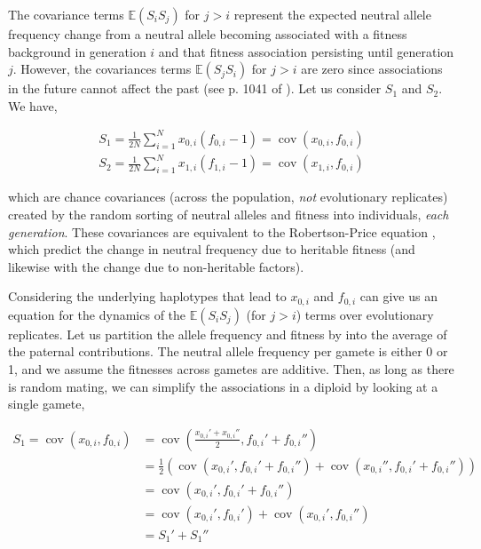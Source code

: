 \documentclass[11pt]{article}
\newcommand{\E}{\mathbb{E}}
\DeclareMathOperator{\cov}{cov}
\begin{document}
The covariance terms $\E(S_i S_j)$ for $j > i$ represent the expected neutral
allele frequency change from a neutral allele becoming associated with a
fitness background in generation $i$ and that fitness association persisting
until generation $j$. However, the covariances terms $\E(S_j S_i)$ for $j > i$
are zero since associations in the future cannot affect the past (see p. 1041
of \cite{Buffalo2019-qs}). Let us consider $S_1$ and $S_2$. We have,

\begin{align}
  S_1 = \frac{1}{2N} \sum_{i=1}^N x_{0,i}(f_{0,i} - 1) = \cov(x_{0,i}, f_{0,i}) \\
  S_2 = \frac{1}{2N} \sum_{i=1}^N x_{1,i}(f_{1,i} - 1) = \cov(x_{1,i}, f_{0,i})
\end{align}

which are chance covariances (across the population, \emph{not} evolutionary
replicates) created by the random sorting of neutral alleles and fitness into
individuals, \emph{each generation}. These covariances are equivalent to the
Robertson-Price equation \parencite{Robertson1966-fs,Price1970-si}, which
predict the change in neutral frequency due to heritable fitness (and likewise
with the change due to non-heritable factors).

Considering the underlying haplotypes that lead to $x_{0,i}$ and $f_{0,i}$ can
give us an equation for the dynamics of the $\E(S_i S_j)$ (for $j > i$) terms
over evolutionary replicates. Let us partition the allele frequency and fitness
by into the average of the paternal contributions. The neutral allele frequency
per gamete is either 0 or 1, and we assume the fitnesses across gametes are
additive. Then, as long as there is random mating, we can simplify the
associations in a diploid by looking at a single gamete,

\begin{align}
  S_1 = \cov(x_{0,i}, f_{0,i}) &= \cov\left(\frac{x_{0,i}' + x_{0,i}''}{2}, f_{0,i}' + f_{0,i}''\right)  \\
                               &= \frac{1}{2}\left(\cov(x_{0,i}', f_{0,i}' + f_{0,i}'') + \cov(x_{0,i}'', f_{0,i}' + f_{0,i}'')\right)  \\
                               &= \cov(x_{0,i}', f_{0,i}' + f_{0,i}'')  \\
                               &= \cov(x_{0,i}', f_{0,i}') + \cov(x_{0,i}', f_{0,i}'')  \\
                               &= S_1' + S_1''
\end{align}
\end{document}
